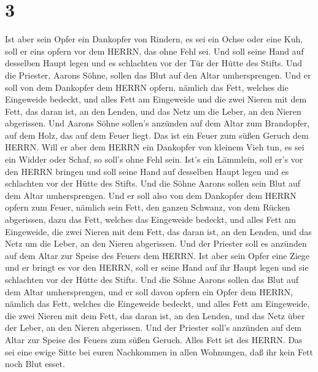 \hypertarget{section-2}{%
\section{3}\label{section-2}}

 Ist aber sein Opfer ein Dankopfer von Rindern, es sei ein
Ochse oder eine Kuh, soll er eins opfern vor dem HERRN, das ohne Fehl
sei.  Und soll seine Hand auf desselben Haupt legen und es
schlachten vor der Tür der Hütte des Stifts. Und die Priester, Aarons
Söhne, sollen das Blut auf den Altar umhersprengen.  Und er
soll von dem Dankopfer dem HERRN opfern, nämlich das Fett, welches die
Eingeweide bedeckt, und alles Fett am Eingeweide  und die
zwei Nieren mit dem Fett, das daran ist, an den Lenden, und das Netz um
die Leber, an den Nieren abgerissen.  Und Aarons Söhne
sollen's anzünden auf dem Altar zum Brandopfer, auf dem Holz, das auf
dem Feuer liegt. Das ist ein Feuer zum süßen Geruch dem HERRN.
 Will er aber dem HERRN ein Dankopfer von kleinem Vieh tun,
es sei ein Widder oder Schaf, so soll's ohne Fehl sein. 
Ist's ein Lämmlein, soll er's vor den HERRN bringen  und
soll seine Hand auf desselben Haupt legen und es schlachten vor der
Hütte des Stifts. Und die Söhne Aarons sollen sein Blut auf dem Altar
umhersprengen.  Und er soll also von dem Dankopfer dem HERRN
opfern zum Feuer, nämlich sein Fett, den ganzen Schwanz, von dem Rücken
abgerissen, dazu das Fett, welches das Eingeweide bedeckt, und alles
Fett am Eingeweide,  die zwei Nieren mit dem Fett, das
daran ist, an den Lenden, und das Netz um die Leber, an den Nieren
abgerissen.  Und der Priester soll es anzünden auf dem
Altar zur Speise des Feuers dem HERRN.  Ist aber sein Opfer
eine Ziege und er bringt es vor den HERRN,  soll er seine
Hand auf ihr Haupt legen und sie schlachten vor der Hütte des Stifts.
Und die Söhne Aarons sollen das Blut auf dem Altar umhersprengen,
 und er soll davon opfern ein Opfer dem HERRN, nämlich das
Fett, welches die Eingeweide bedeckt, und alles Fett am Eingeweide,
 die zwei Nieren mit dem Fett, das daran ist, an den
Lenden, und das Netz über der Leber, an den Nieren abgerissen.
 Und der Priester soll's anzünden auf dem Altar zur Speise
des Feuers zum süßen Geruch. Alles Fett ist des HERRN.  Das
sei eine ewige Sitte bei euren Nachkommen in allen Wohnungen, daß ihr
kein Fett noch Blut esset.

